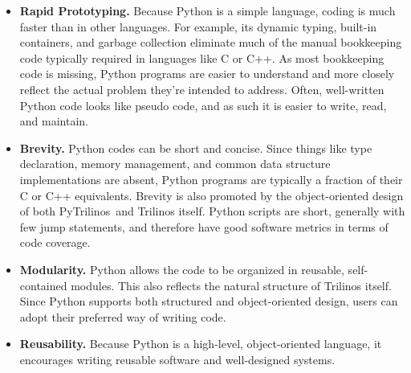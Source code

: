 \documentclass[acmtocl]{acmtrans2m}
\newcommand{\PyTrilinos}{{PyTrilinos}}
\begin{document}
\begin{itemize}

\item {\bf Rapid Prototyping.}  Because Python is a simple language,
  coding is much faster than in other languages. For example, its
  dynamic typing, built-in containers, and garbage collection
  eliminate much of the manual bookkeeping code typically required in
  languages like C or C++. As most bookkeeping code is missing, Python
  programs are easier to understand and more closely reflect the
  actual problem they're intended to address.  Often, well-written
  Python code looks like pseudo code, and as such it is easier to
  write, read, and maintain.

\item {\bf Brevity.} Python codes can be short and concise. Since
  things like type declaration, memory management, and common data
  structure implementations are absent, Python programs are typically
  a fraction of their C or C++ equivalents.  Brevity is also promoted
  by the object-oriented design of both \PyTrilinos\ and Trilinos
  itself.  Python scripts are short, generally with few jump
  statements, and therefore have good software metrics in terms of
  code coverage.

\item {\bf Modularity.} Python allows the code to be organized in
  reusable, self-contained modules.  This also reflects the natural
  structure of Trilinos itself. Since Python supports both structured
  and object-oriented design, users can adopt their preferred way of
  writing code.

\item {\bf Reusability.} Because Python is a high-level,
  object-oriented language, it encourages writing reusable software
  and well-designed systems.



\end{itemize}
\end{document}
